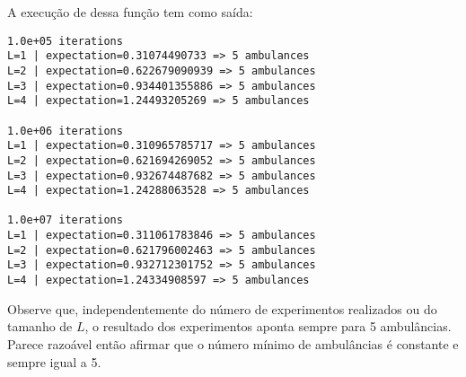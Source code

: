 \documentclass[9.5pt,reqno,a4paper]{amsart}
\begin{document}
A execução de dessa função tem como saída:

\begin{verbatim}
1.0e+05 iterations
L=1 | expectation=0.31074490733 => 5 ambulances
L=2 | expectation=0.622679090939 => 5 ambulances
L=3 | expectation=0.934401355886 => 5 ambulances
L=4 | expectation=1.24493205269 => 5 ambulances

1.0e+06 iterations
L=1 | expectation=0.310965785717 => 5 ambulances
L=2 | expectation=0.621694269052 => 5 ambulances
L=3 | expectation=0.932674487682 => 5 ambulances
L=4 | expectation=1.24288063528 => 5 ambulances

1.0e+07 iterations
L=1 | expectation=0.311061783846 => 5 ambulances
L=2 | expectation=0.621796002463 => 5 ambulances
L=3 | expectation=0.932712301752 => 5 ambulances
L=4 | expectation=1.24334908597 => 5 ambulances
\end{verbatim}

Observe que, independentemente do número de experimentos realizados ou do tamanho de $L$, o resultado dos experimentos aponta sempre para 5 ambulâncias. Parece razoável então afirmar que o número mínimo de ambulâncias é constante e sempre igual a 5.
\end{document}
